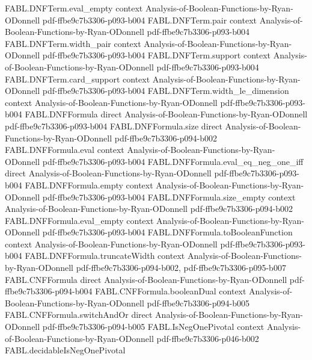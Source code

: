 \begin{theorem}
  {FABL.DNFTerm.eval_empty}
  {context}
  {Analysis-of-Boolean-Functions-by-Ryan-ODonnell}
  {pdf-ffbe9c7b3306-p093-b004}
\proofstep
  {FABL.DNFTerm.pair}
  {context}
  {Analysis-of-Boolean-Functions-by-Ryan-ODonnell}
  {pdf-ffbe9c7b3306-p093-b004}
\proofstep
  {FABL.DNFTerm.width_pair}
  {context}
  {Analysis-of-Boolean-Functions-by-Ryan-ODonnell}
  {pdf-ffbe9c7b3306-p093-b004}
\proofstep
  {FABL.DNFTerm.support}
  {context}
  {Analysis-of-Boolean-Functions-by-Ryan-ODonnell}
  {pdf-ffbe9c7b3306-p093-b004}
\proofstep
  {FABL.DNFTerm.card_support}
  {context}
  {Analysis-of-Boolean-Functions-by-Ryan-ODonnell}
  {pdf-ffbe9c7b3306-p093-b004}
\proofstep
  {FABL.DNFTerm.width_le_dimension}
  {context}
  {Analysis-of-Boolean-Functions-by-Ryan-ODonnell}
  {pdf-ffbe9c7b3306-p093-b004}
\proofstep
  {FABL.DNFFormula}
  {direct}
  {Analysis-of-Boolean-Functions-by-Ryan-ODonnell}
  {pdf-ffbe9c7b3306-p093-b004}
\proofstep
  {FABL.DNFFormula.size}
  {direct}
  {Analysis-of-Boolean-Functions-by-Ryan-ODonnell}
  {pdf-ffbe9c7b3306-p094-b002}
\proofstep
  {FABL.DNFFormula.eval}
  {context}
  {Analysis-of-Boolean-Functions-by-Ryan-ODonnell}
  {pdf-ffbe9c7b3306-p093-b004}
\proofstep
  {FABL.DNFFormula.eval_eq_neg_one_iff}
  {direct}
  {Analysis-of-Boolean-Functions-by-Ryan-ODonnell}
  {pdf-ffbe9c7b3306-p093-b004}
\proofstep
  {FABL.DNFFormula.empty}
  {context}
  {Analysis-of-Boolean-Functions-by-Ryan-ODonnell}
  {pdf-ffbe9c7b3306-p093-b004}
\proofstep
  {FABL.DNFFormula.size_empty}
  {context}
  {Analysis-of-Boolean-Functions-by-Ryan-ODonnell}
  {pdf-ffbe9c7b3306-p094-b002}
\proofstep
  {FABL.DNFFormula.eval_empty}
  {context}
  {Analysis-of-Boolean-Functions-by-Ryan-ODonnell}
  {pdf-ffbe9c7b3306-p093-b004}
\proofstep
  {FABL.DNFFormula.toBooleanFunction}
  {context}
  {Analysis-of-Boolean-Functions-by-Ryan-ODonnell}
  {pdf-ffbe9c7b3306-p093-b004}
\proofstep
  {FABL.DNFFormula.truncateWidth}
  {context}
  {Analysis-of-Boolean-Functions-by-Ryan-ODonnell}
  {pdf-ffbe9c7b3306-p094-b002,
    pdf-ffbe9c7b3306-p095-b007}
\proofstep
  {FABL.CNFFormula}
  {direct}
  {Analysis-of-Boolean-Functions-by-Ryan-ODonnell}
  {pdf-ffbe9c7b3306-p094-b004}
\proofstep
  {FABL.CNFFormula.booleanDual}
  {context}
  {Analysis-of-Boolean-Functions-by-Ryan-ODonnell}
  {pdf-ffbe9c7b3306-p094-b005}
\proofstep
  {FABL.CNFFormula.switchAndOr}
  {direct}
  {Analysis-of-Boolean-Functions-by-Ryan-ODonnell}
  {pdf-ffbe9c7b3306-p094-b005}
\proofstep
  {FABL.IsNegOnePivotal}
  {context}
  {Analysis-of-Boolean-Functions-by-Ryan-ODonnell}
  {pdf-ffbe9c7b3306-p046-b002}
\proofstep
  {FABL.decidableIsNegOnePivotal}

\end{theorem}
